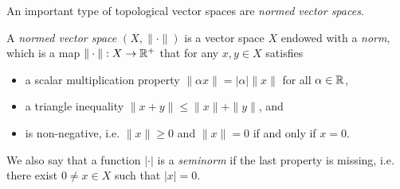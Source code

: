 An important type of topological vector spaces are \emph{normed vector spaces}.
\begin{definition}
    A \emph{normed vector space} $(X,\|\cdot\|)$ is a vector space $X$ endowed with a \emph{norm}, which is a map $\|\cdot\|:X\to \mathbb{R}^+$ that for any $x,y\in X$ satisfies
    \begin{itemize}
        \item a scalar multiplication property $\|\alpha x\|=|\alpha|\|x\|$ for all $\alpha\in\mathbb{R}$,
        \item a triangle inequality $\|x+y\|\leq \|x\|+\|y\|$, and 
        \item is non-negative, i.e. $\|x\|\geq 0$ and $\|x\|=0$ if and only if $x=0$.
    \end{itemize}
    We also say that a function $|\cdot|$ is a \emph{seminorm} if the last property is missing, i.e. there exist $0 \neq x\in X$ such that $|x|=0$.
\end{definition}

